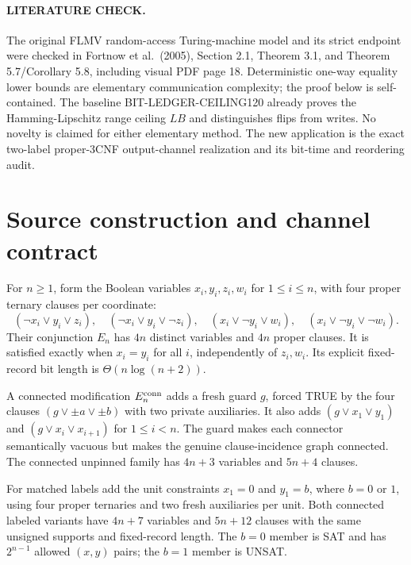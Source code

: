 \documentclass[11pt]{article}
\begin{document}
\paragraph{LITERATURE CHECK.}
The original FLMV random-access Turing-machine model and its strict endpoint were checked in Fortnow et al.\ (2005), Section 2.1, Theorem 3.1, and Theorem 5.7/Corollary 5.8, including visual PDF page 18. Deterministic one-way equality lower bounds are elementary communication complexity; the proof below is self-contained. The baseline BIT-LEDGER-CEILING120 already proves the Hamming-Lipschitz range ceiling $LB$ and distinguishes flips from writes. No novelty is claimed for either elementary method. The new application is the exact two-label proper-3CNF output-channel realization and its bit-time and reordering audit.

\section{Source construction and channel contract}
For $n\ge1$, form the Boolean variables $x_i,y_i,z_i,w_i$ for $1\le i\le n$, with four proper ternary clauses per coordinate:
\[
 (\neg x_i\vee y_i\vee z_i),\quad
 (\neg x_i\vee y_i\vee\neg z_i),\quad
 (x_i\vee\neg y_i\vee w_i),\quad
 (x_i\vee\neg y_i\vee\neg w_i).
\]
Their conjunction $E_n$ has $4n$ distinct variables and $4n$ proper clauses. It is satisfied exactly when $x_i=y_i$ for all $i$, independently of $z_i,w_i$. Its explicit fixed-record bit length is $\Theta(n\log(n+2))$.

A connected modification $E_n^{\rm conn}$ adds a fresh guard $g$, forced TRUE by the four clauses $(g\vee\pm a\vee\pm b)$ with two private auxiliaries. It also adds $(g\vee x_1\vee y_1)$ and $(g\vee x_i\vee x_{i+1})$ for $1\le i<n$. The guard makes each connector semantically vacuous but makes the genuine clause-incidence graph connected. The connected unpinned family has $4n+3$ variables and $5n+4$ clauses.

For matched labels add the unit constraints $x_1=0$ and $y_1=b$, where $b=0$ or $1$, using four proper ternaries and two fresh auxiliaries per unit. Both connected labeled variants have $4n+7$ variables and $5n+12$ clauses with the same unsigned supports and fixed-record length. The $b=0$ member is SAT and has $2^{n-1}$ allowed $(x,y)$ pairs; the $b=1$ member is UNSAT.
\end{document}
